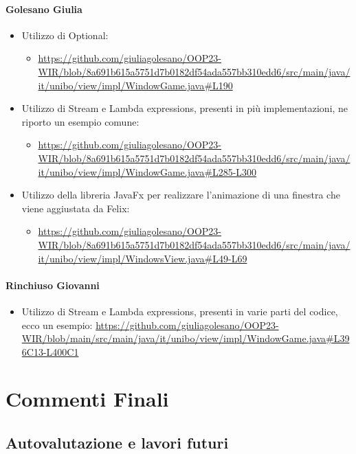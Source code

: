 \documentclass[a4paper,12pt]{report}
\begin{document}
\subsubsection{Golesano Giulia}
\begin{itemize}
    \item Utilizzo di Optional:
        \begin{itemize}
        \item  \url{https://github.com/giuliagolesano/OOP23-WIR/blob/8a691b615a5751d7b0182df54ada557bb310edd6/src/main/java/it/unibo/view/impl/WindowGame.java#L190}
        \end{itemize}
    \item Utilizzo di Stream e Lambda expressions, presenti in più implementazioni, ne riporto un esempio comune:
        \begin{itemize}
        \item  \url{https://github.com/giuliagolesano/OOP23-WIR/blob/8a691b615a5751d7b0182df54ada557bb310edd6/src/main/java/it/unibo/view/impl/WindowGame.java#L285-L300}
        \end{itemize}
    \item Utilizzo della libreria JavaFx per realizzare l'animazione di una finestra che viene aggiustata da Felix:
    \begin{itemize}
    \item \url{https://github.com/giuliagolesano/OOP23-WIR/blob/8a691b615a5751d7b0182df54ada557bb310edd6/src/main/java/it/unibo/view/impl/WindowsView.java#L49-L69}
    \end{itemize}
\end{itemize}
    

\subsubsection{Rinchiuso Giovanni}
\begin{itemize}
\item Utilizzo di Stream e Lambda expressions, presenti in varie parti del codice, ecco un esempio: 
\url {https://github.com/giuliagolesano/OOP23-WIR/blob/main/src/main/java/it/unibo/view/impl/WindowGame.java#L396C13-L400C1}
\end{itemize}

\chapter{Commenti Finali}
\section{Autovalutazione e lavori futuri}
\end{document}

